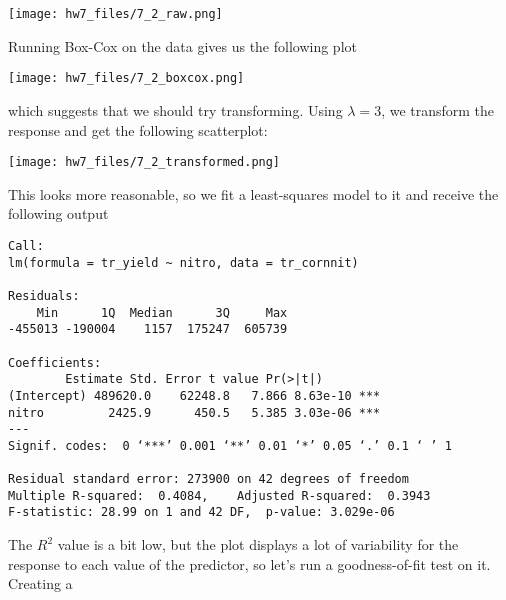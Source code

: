 \documentclass{article}
\begin{document}
\texttt{[image: hw7\_files/7\_2\_raw.png]}

Running Box-Cox on the data gives us the following plot 

\texttt{[image: hw7\_files/7\_2\_boxcox.png]}

which suggests that we should try transforming. Using $\lambda=3$, we transform the response and get the following scatterplot:

\texttt{[image: hw7\_files/7\_2\_transformed.png]}

This looks more reasonable, so we fit a least-squares model to it and receive the following output

\begin{verbatim}
Call:
lm(formula = tr_yield ~ nitro, data = tr_cornnit)

Residuals:
    Min      1Q  Median      3Q     Max 
-455013 -190004    1157  175247  605739 

Coefficients:
        Estimate Std. Error t value Pr(>|t|)    
(Intercept) 489620.0    62248.8   7.866 8.63e-10 ***
nitro         2425.9      450.5   5.385 3.03e-06 ***
---
Signif. codes:  0 ‘***’ 0.001 ‘**’ 0.01 ‘*’ 0.05 ‘.’ 0.1 ‘ ’ 1

Residual standard error: 273900 on 42 degrees of freedom
Multiple R-squared:  0.4084,    Adjusted R-squared:  0.3943 
F-statistic: 28.99 on 1 and 42 DF,  p-value: 3.029e-06
\end{verbatim}

The $R^2$ value is a bit low, but the plot displays a lot of variability for the response to each value of the predictor, so let's run a goodness-of-fit test on it. Creating a 

\end{document}
